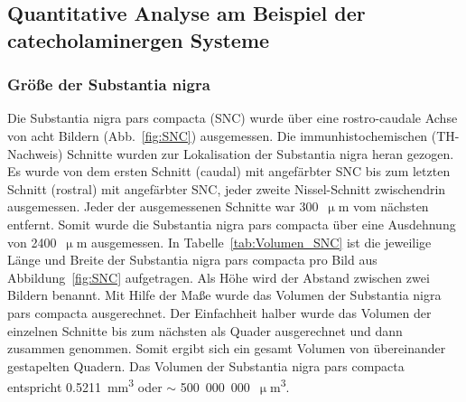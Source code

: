 \subsection{Quantitative Analyse am Beispiel der catecholaminergen Systeme}
\label{sec:immu}

\subsubsection{Größe der Substantia nigra}

Die Substantia nigra pars compacta (SNC) wurde über eine rostro-caudale Achse von acht Bildern (Abb.~\ref{fig:SNC}) ausgemessen. Die immunhistochemischen (TH-Nachweis) Schnitte wurden zur Lokalisation der Substantia nigra heran gezogen. Es wurde von dem ersten Schnitt (caudal) mit angefärbter SNC bis zum letzten Schnitt (rostral) mit angefärbter SNC, jeder zweite Nissel-Schnitt zwischendrin ausgemessen. Jeder der ausgemessenen Schnitte war 300~$\upmu$m vom nächsten entfernt. Somit wurde die Substantia nigra pars compacta über eine Ausdehnung von 2400~$\upmu$m ausgemessen. In Tabelle~\ref{tab:Volumen_SNC} ist die jeweilige Länge und Breite der Substantia nigra pars compacta pro Bild aus Abbildung~\ref{fig:SNC} aufgetragen. Als Höhe wird der Abstand zwischen zwei Bildern benannt. Mit Hilfe der Maße wurde das Volumen der Substantia nigra pars compacta ausgerechnet. Der Einfachheit halber wurde das Volumen der einzelnen Schnitte bis zum nächsten als Quader ausgerechnet und dann zusammen genommen. Somit ergibt sich ein gesamt Volumen von übereinander gestapelten Quadern. Das Volumen der Substantia nigra pars compacta entspricht 0.5211~mm\textsuperscript{3} oder $\sim$ 500~000~000~$\upmu$m\textsuperscript{3}.


